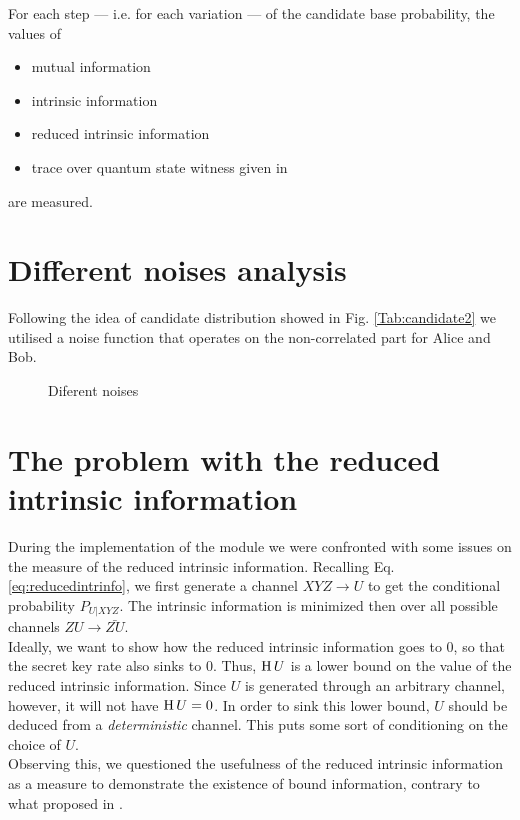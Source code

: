     For each step --- i.e. for each variation --- of the candidate base probability, the values of 
    \begin{itemize}
    	\item	mutual information
    	\item	intrinsic information
    	\item	reduced intrinsic information
    	\item	trace over quantum state witness given in \cite{DPS04}
    \end{itemize}
    are measured.
\section{Different noises analysis}
	Following the idea of candidate distribution showed in Fig. \ref{Tab:candidate2} we utilised a noise function that operates on the non-correlated part for Alice and Bob.
	 
	\begin{figure}
		\begin{subfigure}{0.5\textwidth}
			
		\end{subfigure}
		\begin{subfigure}{0.5\textwidth}
			
		\end{subfigure}
		\caption{Diferent noises}
		\label{Fig:noises}
	\end{figure}
\section{The problem with the reduced intrinsic information}
    During the implementation of the module we were confronted with some issues on the measure of the reduced intrinsic information.
    Recalling Eq. \ref{eq:reducedintrinfo}, we first generate a channel $XYZ \rightarrow U$ to get the conditional probability $P_{U|XYZ}$. 
    The intrinsic information is minimized then over all possible channels $ZU \rightarrow \bar{ZU}$.\\
    Ideally, we want to show how the reduced intrinsic information goes to $0$, so that the secret key rate also sinks to $0$. 
    Thus, $\operatorname{H}{U}$ is a lower bound on the value of the reduced intrinsic information.
    Since $U$ is generated through an arbitrary channel, however, it will not have $\operatorname{H}{U} = 0$.
    In order to sink this lower bound, $U$ should be deduced from a \emph{deterministic} channel.
    This puts some sort of conditioning on the choice of $U$.\\
    
    Observing this, we questioned the usefulness of the reduced intrinsic information as a measure to demonstrate the existence of bound information, contrary to what proposed in \cite{RW03}. 
    
    